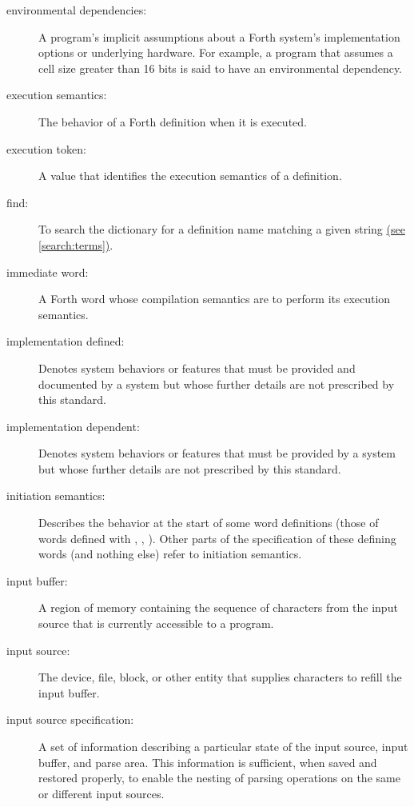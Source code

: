 \begin{description}
\item[environmental dependencies:]
	A program's implicit assumptions about a Forth system's
	implementation options or underlying hardware. For example,
	a program that assumes a cell size greater than 16 bits is
	said to have an environmental dependency.

\item[execution semantics:]
	The behavior of a Forth definition when it is executed.

\item[execution token:]
	A value that identifies the execution semantics of a definition.

\item[find:]
	To search the dictionary for a definition name matching a given
	string \uline{(see \ref{search:terms})}.
	
\item[immediate word:]
	A Forth word whose compilation semantics are to perform its
	execution semantics.

\item[implementation defined:]
	Denotes system behaviors or features that must be provided and
	documented by a system but whose further details are not prescribed
	by this standard.

\item[implementation dependent:]
	Denotes system behaviors or features that must be provided by a
	system but whose further details are not prescribed by this standard.

\item[initiation semantics:]
	Describes the behavior at the start of some word definitions (those
	of words defined with \word{:}, , 
	).  Other parts of the specification of these defining
	words (and nothing else) refer to initiation semantics.

\item[input buffer:]
	A region of memory containing the sequence of characters from the
	input source that is currently accessible to a program.

\item[input source:]
	The device, file, block, or other entity that supplies characters
	to refill the input buffer.

\item[input source specification:]
	A set of information describing a particular state of the input
	source, input buffer, and parse area. This information is
	sufficient, when saved and restored properly, to enable the nesting
	of parsing operations on the same or different input sources.


\end{description}
